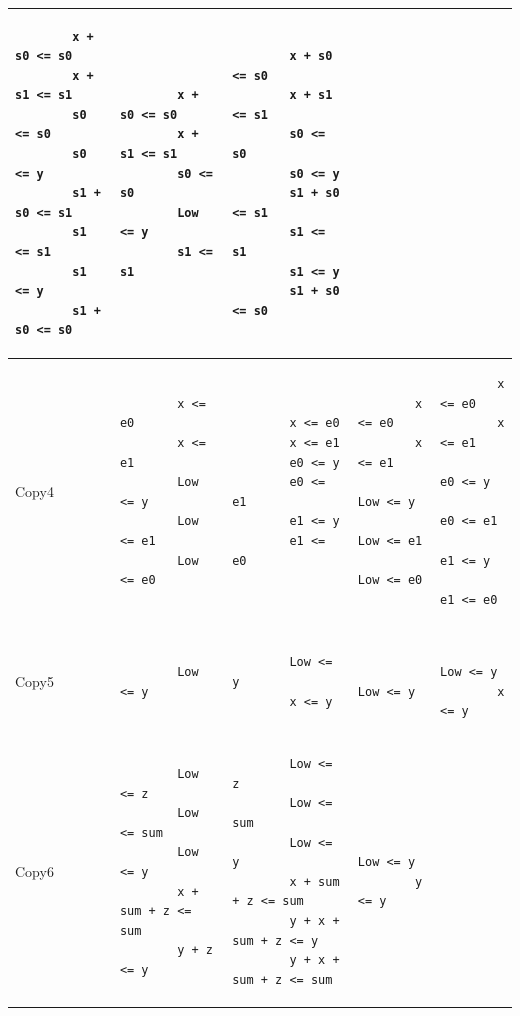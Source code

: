 \begin{table}
\begin{tabular}{|l|l|l|l|l|}
\begin{lstlisting}
		x + s0 <= s0
		x + s1 <= s1
		s0 <= s0
		s0 <= y
		s1 + s0 <= s1
		s1 <= s1
		s1 <= y
		s1 + s0 <= s0
		\end{lstlisting}&
		\begin{lstlisting}
		x + s0 <= s0
		x + s1 <= s1
		s0 <= s0
		Low <= y
		s1 <= s1
		\end{lstlisting}&
		\begin{lstlisting}
		x + s0 <= s0
		x + s1 <= s1
		s0 <= s0
		s0 <= y
		s1 + s0 <= s1
		s1 <= s1
		s1 <= y
		s1 + s0 <= s0
		\end{lstlisting}
		\\
		\hline
		Copy4&
		\begin{lstlisting}
		x <= e0
		x <= e1
		Low <= y
		Low <= e1
		Low <= e0
		\end{lstlisting}&
		\begin{lstlisting}
		x <= e0
		x <= e1
		e0 <= y
		e0 <= e1
		e1 <= y
		e1 <= e0
		\end{lstlisting}&
		\begin{lstlisting}
		x <= e0
		x <= e1
		Low <= y
		Low <= e1
		Low <= e0
		\end{lstlisting}&
		\begin{lstlisting}
		x <= e0
		x <= e1
		e0 <= y
		e0 <= e1
		e1 <= y
		e1 <= e0
		\end{lstlisting}
		\\
		\hline
		Copy5&
		\begin{lstlisting}
		Low <= y
		\end{lstlisting} &
		\begin{lstlisting}
		Low <= y
		x <= y
		\end{lstlisting}&
		\begin{lstlisting}
		Low <= y 
		\end{lstlisting}&
		\begin{lstlisting}
		Low <= y
		x <= y
		\end{lstlisting}\\
		\hline
		Copy6&
		\begin{lstlisting}
		Low <= z
		Low <= sum
		Low <= y
		x + sum + z <= sum
		y + z <= y
		\end{lstlisting}&
		\begin{lstlisting}
		Low <= z
		Low <= sum
		Low <= y
		x + sum + z <= sum
		y + x + sum + z <= y
		y + x + sum + z <= sum
		\end{lstlisting} &
		\begin{lstlisting}
		Low <= y
		y <= y  
		\end{lstlisting}&
		\begin{lstlisting}

\end{lstlisting}
\end{tabular}
\end{table}

